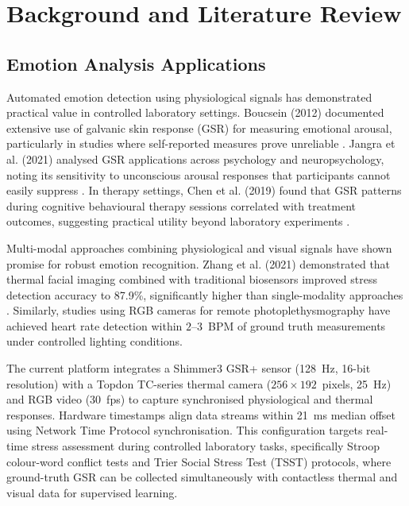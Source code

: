 \documentclass{report}
\begin{document}
    \chapter{Background and Literature Review}
    \label{ch:background}


    \section{Emotion Analysis Applications}
    \label{sec:emotion_apps}

    Automated emotion detection using physiological signals has demonstrated practical value in controlled laboratory settings. Boucsein (2012) documented extensive use of galvanic skin response (GSR) for measuring emotional arousal, particularly in studies where self-reported measures prove unreliable \cite{boucsein2012}. Jangra et al. (2021) analysed GSR applications across psychology and neuropsychology, noting its sensitivity to unconscious arousal responses that participants cannot easily suppress \cite{jangra2021}. In therapy settings, Chen et al. (2019) found that GSR patterns during cognitive behavioural therapy sessions correlated with treatment outcomes, suggesting practical utility beyond laboratory experiments \cite{chen2019}.

    Multi-modal approaches combining physiological and visual signals have shown promise for robust emotion recognition. Zhang et al. (2021) demonstrated that thermal facial imaging combined with traditional biosensors improved stress detection accuracy to 87.9\%, significantly higher than single-modality approaches \cite{zhang2021}. Similarly, studies using RGB cameras for remote photoplethysmography have achieved heart rate detection within $2$--$3$~BPM of ground truth measurements under controlled lighting conditions.

    The current platform integrates a Shimmer3 GSR+ sensor (128~Hz, 16-bit resolution) with a Topdon TC-series thermal camera ($256 \times 192$~pixels, 25~Hz) and RGB video (30~fps) to capture synchronised physiological and thermal responses. Hardware timestamps align data streams within 21~ms median offset using Network Time Protocol synchronisation. This configuration targets real-time stress assessment during controlled laboratory tasks, specifically Stroop colour-word conflict tests and Trier Social Stress Test (TSST) protocols, where ground-truth GSR can be collected simultaneously with contactless thermal and visual data for supervised learning.
\end{document}
